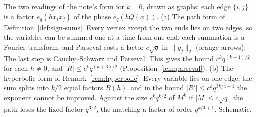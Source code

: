 \caption{The two readings of the note's form for $k=6$, drawn as graphs: each
edge $\{i,j\}$ is a factor $e_q(hx_ix_j)$ of the phase $e_q(hQ(x))$.
(a) The path form of Definition~\ref{def:sign-sums}. Every vertex except the
two ends lies on two edges, so the variables can be summed one at a time from
one end; each summation is a Fourier transform, and Parseval costs a factor
$c\sqrt q$ in $\|g_j\|_2$ (orange arrows). The last step is
Cauchy--Schwarz and Parseval. This gives the bound $c^kq^{(k+1)/2}$ for each
$h\ne0$, and $\lvert R\rvert\le c^kq^{(k+3)/2}$
(Proposition~\ref{lem:parseval}). (b) The hyperbolic form of
Remark~\ref{rem:hyperbolic}. Every variable lies on one edge, the sum
splits into $k/2$ equal factors $B(h)$, and in the bound
$\lvert R'\rvert\le c^kq^{3k/4+1}$ the exponent cannot be improved. Against the size
$c^kq^{k/2}$ of $M^k$ if $\lvert M\rvert\le c\sqrt q$, the path loses the
fixed factor $q^{3/2}$, the matching a factor of order $q^{k/4+1}$.
Schematic.}
\label{fig:path-parseval}

